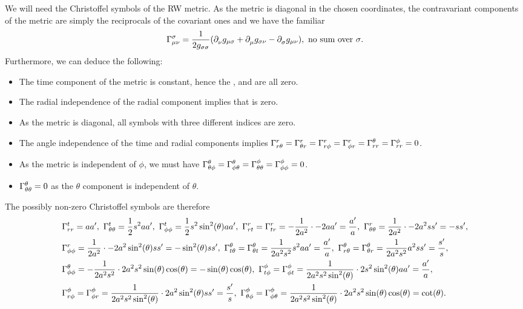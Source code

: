 We will need the Christoffel symbols of the RW metric. As the metric is diagonal in the chosen coordinates, the contravariant components of the metric are simply the reciprocals of the covariant ones and we have the familiar
\begin{align*}
	\chris{\sigma}{\mu}{\nu} = \frac{1}{2g_{\sigma\sigma}}(\del{\nu}{g_{\mu\sigma}} + \del{\mu}{g_{\sigma\nu}} - \del{\sigma}{g_{\mu\nu}}),\ \text{no sum over $\sigma$.}
\end{align*}
Furthermore, we can deduce the following:
\begin{itemize}
	\item The time component of the metric is constant, hence the ,  and  are all zero.
	\item The radial independence of the radial component implies that  is zero.
	\item As the metric is diagonal, all symbols with three different indices are zero.
	\item The angle independence of the time and radial components implies $\chris{r}{r}{\theta} = \chris{r}{\theta}{r} = \chris{r}{r}{\phi} = \chris{r}{\phi}{r} = \chris{\theta}{r}{r} = \chris{\phi}{r}{r} = 0$.
	\item As the metric is independent of $\phi$, we must have $\chris{\theta}{\theta}{\phi} = \chris{\theta}{\phi}{\theta} = \chris{\phi}{\theta}{\theta} = \chris{\phi}{\phi}{\phi} = 0$.
	\item $\chris{\theta}{\theta}{\theta} = 0$ as the $\theta$ component is independent of $\theta$.
\end{itemize}
The possibly non-zero Christoffel symbols are therefore
\begin{align*}
	&\chris{t}{r}{r} = aa\p,\ \chris{t}{\theta}{\theta} = \frac{1}{2}s^{2}aa\p,\ \chris{t}{\phi}{\phi} = \frac{1}{2}s^{2}\sin[2](\theta)aa\p,\ \chris{r}{r}{t} = \chris{r}{t}{r} = -\frac{1}{2a^{2}}\cdot -2aa\p = \frac{a\p}{a},\ \chris{r}{\theta}{\theta} = \frac{1}{2a^{2}}\cdot -2a^{2}ss\p = -ss\p, \\
	&\chris{r}{\phi}{\phi} = \frac{1}{2a^{2}}\cdot -2a^{2}\sin[2](\theta)ss\p = -\sin[2](\theta)ss\p,\ \chris{\theta}{t}{\theta} = \chris{\theta}{\theta}{t} = \frac{1}{2a^{2}s^{2}}s^{2}aa\p = \frac{a\p}{a},\  \chris{\theta}{r}{\theta} = \chris{\theta}{\theta}{r} = \frac{1}{2a^{2}s^{2}}a^{2}ss\p = \frac{s\p}{s}, \\
	&\chris{\theta}{\phi}{\phi} = -\frac{1}{2a^{2}s^{2}}\cdot 2a^{2}s^{2}\sin(\theta)\cos(\theta) = -\sin(\theta)\cos(\theta),\ \chris{\phi}{t}{\phi} = \chris{\phi}{\phi}{t} = \frac{1}{2a^{2}s^{2}\sin[2](\theta)}\cdot 2s^{2}\sin[2](\theta)aa\p = \frac{a\p}{a}, \\
	&\chris{\phi}{r}{\phi} = \chris{\phi}{\phi}{r} = \frac{1}{2a^{2}s^{2}\sin[2](\theta)}\cdot 2a^{2}\sin[2](\theta)ss\p = \frac{s\p}{s},\ \chris{\phi}{\theta}{\phi} = \chris{\phi}{\phi}{\theta} = \frac{1}{2a^{2}s^{2}\sin[2](\theta)}\cdot 2a^{2}s^{2}\sin(\theta)\cos(\theta) = \cot(\theta).
\end{align*}

